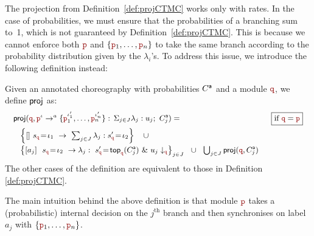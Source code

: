 The projection from Definition~\ref{def:projCTMC} works only with
rates. In the case of probabilities, we must ensure that the
probabilities of a branching sum to~1, which is not guaranteed by
Definition~\ref{def:projCTMC}.
%
This is because we cannot enforce both $\nr$ and
$\{\nr_1,\ldots,\nr_n\}$ to take the same branch according to the
probability distribution given by the \(\lambda_i\)’s. To address this
issue, we introduce the following definition instead:
% 
\begin{definition}\label{def:projDTMC} Given
  an annotated choreography with probabilities ${C}^{\mathsf a}$ and a module
  $\nrr$, we define $\mathsf{proj}$ as:
  \begin{displaymath}\small
    \begin{array}{lr}
      \proj
      (\nrr,\interactl{\nr^\iota}a{\nr_1^{\iota_1'},\ldots,\nr_n^{\iota_n'}})= 
      &  \boxed{\text{if }\nrr=\nr}\\[2mm]
      \
      \begin{array}{lll}
        \left\{\commandBase {} {s_{\nrr}\!=\! \iota_1}{\ \sum_{j\in J}
        \lambda_j: s'_{\nrr}\!=\! \iota_2}\right\}\quad\cup\\[2mm]
        \left\{\commandBase {a_j} {\ s_{\nrr}\!=\! \iota_2} {\lambda_j:}
        \ s_{\nrr}'\!=\! \mathsf{top}_{\nrr}(\anno C_j)\ 
        \&\ \projE {u_j}\nrr\right\}_{j\in J}
        \ \ \cup\ \ \bigcup_{j\in J} \proj (\nrr, \anno C_j)
      \end{array}
    \end{array}
  \end{displaymath}
  The other cases of the definition are equivalent to those in
  Definition \ref{def:projCTMC}.
\end{definition}
The main intuition behind the above definition is that module $\nr$
takes a (probabilistic) internal decision on the $j^{\text{th}}$
branch and then synchronises on label $a_j$ with
$\{\nr_1,\ldots,\nr_n\}$.

\smallskip

